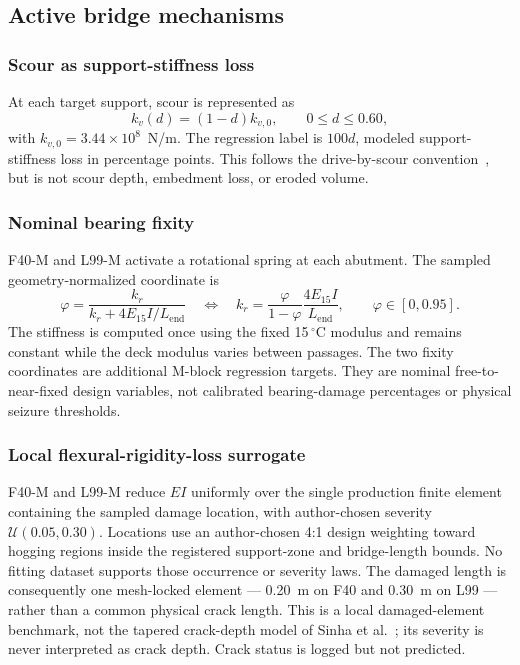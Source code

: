 \subsection{Active bridge mechanisms}
\label{sec:mechanisms}

\subsubsection{Scour as support-stiffness loss}
\label{sec:scour_mech}

At each target support, scour is represented as
\begin{equation}
  k_v(d)=(1-d)k_{v,0}, \qquad 0\le d\le0.60,
  \label{eq:scour}
\end{equation}
with $k_{v,0}=3.44\times10^8$~N/m. The regression label is $100d$,
modeled support-stiffness loss in percentage points. This follows the
drive-by-scour convention~\cite{fernandes2024driveby,
fernandes2025early, prendergast2013investigation}, but is not scour depth,
embedment loss, or eroded volume.

\subsubsection{Nominal bearing fixity}
\label{sec:bearing_mech}

F40-M and L99-M activate a rotational spring at each abutment. The sampled
geometry-normalized coordinate is
\begin{equation}
 \varphi=\frac{k_r}{k_r+4E_{15}I/L_{\mathrm{end}}}
 \quad\Longleftrightarrow\quad
 k_r=\frac{\varphi}{1-\varphi}\frac{4E_{15}I}{L_{\mathrm{end}}},
 \qquad \varphi\in[0,0.95].
 \label{eq:fixity}
\end{equation}
The stiffness is computed once using the fixed 15\,$^{\circ}$C modulus and
remains constant while the deck modulus varies between passages. The two
fixity coordinates are additional M-block regression targets. They are nominal
free-to-near-fixed design variables, not calibrated bearing-damage percentages
or physical seizure thresholds.

\subsubsection{Local flexural-rigidity-loss surrogate}
\label{sec:crack_mech}

F40-M and L99-M reduce $EI$ uniformly over the single production finite element
containing the sampled damage location, with author-chosen severity
$\mathcal{U}(0.05,0.30)$. Locations use an author-chosen 4:1 design weighting
toward hogging regions inside the registered support-zone and bridge-length
bounds. No fitting dataset supports those occurrence or severity laws. The
damaged length is consequently one mesh-locked element --- 0.20~m on F40 and
0.30~m on L99 --- rather than a common physical crack length. This is a local
damaged-element benchmark, not the tapered crack-depth model of Sinha et
al.~\cite{sinha2002simplified}; its severity is never interpreted as crack
depth. Crack status is logged but not predicted.

